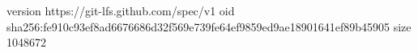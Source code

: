 version https://git-lfs.github.com/spec/v1
oid sha256:fe910c93ef8ad6676686d32f569e739fe64ef9859ed9ae18901641ef89b45905
size 1048672
